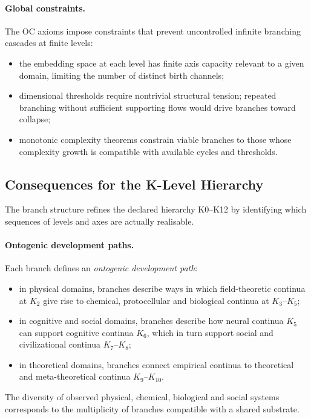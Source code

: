 \paragraph{Global constraints.}
The OC axioms impose constraints that prevent uncontrolled infinite branching
cascades at finite levels:
\begin{itemize}
  \item the embedding space at each level has finite axis capacity relevant
        to a given domain, limiting the number of distinct birth channels;
  \item dimensional thresholds require nontrivial structural tension; repeated
        branching without sufficient supporting flows would drive branches
        toward collapse;
  \item monotonic complexity theorems constrain viable branches to those
        whose complexity growth is compatible with available cycles and
        thresholds.
\end{itemize}

\subsection{Consequences for the K-Level Hierarchy}

The branch structure refines the declared hierarchy K0--K12 by
identifying which sequences of levels and axes are actually realisable.

\paragraph{Ontogenic development paths.}
Each branch defines an \emph{ontogenic development path}:
\begin{itemize}
  \item in physical domains, branches describe ways in which field-theoretic
        continua at \(K_2\) give rise to chemical, protocellular and
        biological continua at \(K_3\)–\(K_5\);
  \item in cognitive and social domains, branches describe how neural
        continua \(K_5\) can support cognitive continua \(K_6\), which in
        turn support social and civilizational continua \(K_7\)–\(K_8\);
  \item in theoretical domains, branches connect empirical continua to
        theoretical and meta-theoretical continua \(K_9\)–\(K_{10}\).
\end{itemize}
The diversity of observed physical, chemical, biological and social systems
corresponds to the multiplicity of branches compatible with a shared
substrate.

